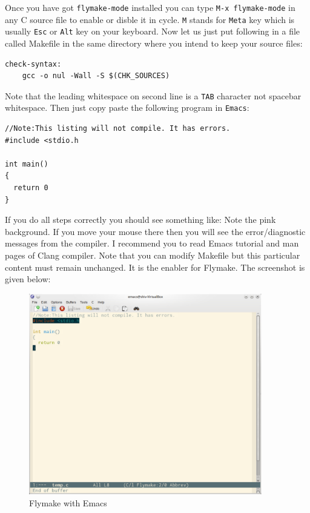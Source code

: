 Once you have got \texttt{flymake-mode} installed you can type \texttt{M-x
  flymake-mode} in any C source file to enable or disble it in
cycle. \texttt{M} stands for \texttt{Meta} key which is usually \texttt{Esc} or
\texttt{Alt} key on your keyboard. Now let us just put following in a file
called Makefile in the same directory where you intend to keep your source
files:

\begin{verbatim}
check-syntax:
    gcc -o nul -Wall -S $(CHK_SOURCES)
\end{verbatim}


Note that the leading whitespace on second line is a \texttt{TAB} character not
spacebar whitespace. Then just copy paste the following program in
\texttt{Emacs}:

\begin{verbatim}
//Note:This listing will not compile. It has errors.
#include <stdio.h

int main()
{
  return 0
}
\end{verbatim}

If you do all steps correctly you should see something like: Note the pink
background. If you move your mouse there then you will see the error/diagnostic
messages from the compiler. I recommend you to read Emacs tutorial and
man pages of Clang compiler. Note that you can modify Makefile but this
particular content must remain unchanged. It is the enabler for Flymake. The
screenshot is given below:

\begin{figure}[t!]
\begin{center}
\includegraphics[width=4in]{figs/flymake.pdf}
\end{center}
\caption{Flymake with Emacs}
\end{figure}

